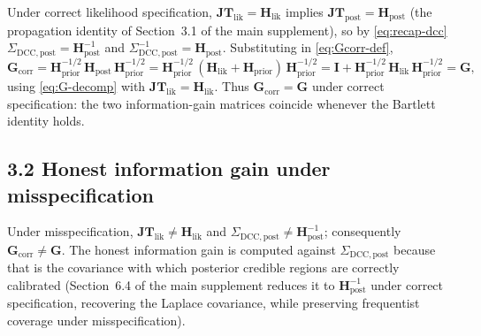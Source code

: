 \documentclass[11pt]{article}
\begin{document}
Under correct likelihood specification, $\mathbf{JT}_{\mathrm{lik}} = \mathbf H_{\mathrm{lik}}$ implies $\mathbf{JT}_{\mathrm{post}} = \mathbf H_{\mathrm{post}}$ (the propagation identity of Section~3.1 of the main supplement), so by \eqref{eq:recap-dcc} $\Sigma_{\mathrm{DCC},\mathrm{post}} = \mathbf H_{\mathrm{post}}^{-1}$ and $\Sigma_{\mathrm{DCC},\mathrm{post}}^{-1} = \mathbf H_{\mathrm{post}}$. Substituting in \eqref{eq:Gcorr-def},
\begin{equation}
\mathbf G_{\mathrm{corr}}
=
\mathbf H_{\mathrm{prior}}^{-1/2}\, \mathbf H_{\mathrm{post}}\, \mathbf H_{\mathrm{prior}}^{-1/2}
=
\mathbf H_{\mathrm{prior}}^{-1/2}\, (\mathbf H_{\mathrm{lik}} + \mathbf H_{\mathrm{prior}})\, \mathbf H_{\mathrm{prior}}^{-1/2}
=
\mathbf I + \mathbf H_{\mathrm{prior}}^{-1/2}\, \mathbf H_{\mathrm{lik}}\, \mathbf H_{\mathrm{prior}}^{-1/2}
=
\mathbf G,
\label{eq:Gcorr-correct-spec}
\end{equation}
using \eqref{eq:G-decomp} with $\mathbf{JT}_{\mathrm{lik}} = \mathbf H_{\mathrm{lik}}$. Thus $\mathbf G_{\mathrm{corr}} = \mathbf G$ under correct specification: the two information-gain matrices coincide whenever the Bartlett identity holds.

\subsection*{3.2 Honest information gain under misspecification}

Under misspecification, $\mathbf{JT}_{\mathrm{lik}} \neq \mathbf H_{\mathrm{lik}}$ and $\Sigma_{\mathrm{DCC},\mathrm{post}} \neq \mathbf H_{\mathrm{post}}^{-1}$; consequently $\mathbf G_{\mathrm{corr}} \neq \mathbf G$. The honest information gain is computed against $\Sigma_{\mathrm{DCC},\mathrm{post}}$ because that is the covariance with which posterior credible regions are correctly calibrated (Section~6.4 of the main supplement reduces it to $\mathbf H_{\mathrm{post}}^{-1}$ under correct specification, recovering the Laplace covariance, while preserving frequentist coverage under misspecification).
\end{document}
